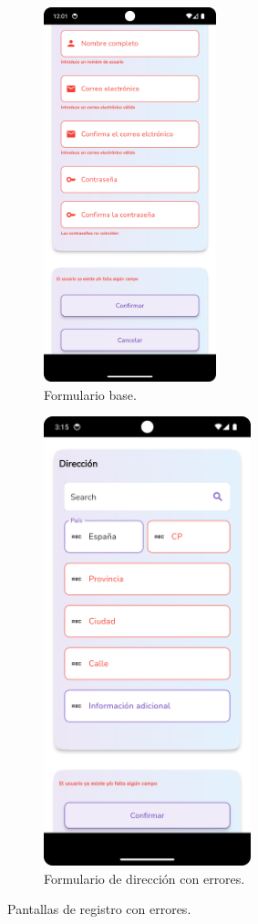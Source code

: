 \documentclass[a4paper, 12pt]{article}
\begin{document}
\begin{figure}[H]
   	\begin{subfigure}{0.48\textwidth}
		\begin{center}
			{\includegraphics[width=5cm]{app/RegisterUserError.png}\par}
			\caption{Formulario base.}
		\end{center}  
	\end{subfigure}\hfill
   	\begin{subfigure}{0.48\textwidth}
		\begin{center}
			{\includegraphics[width=6cm]{app/AddressError.png}\par}
			\caption{Formulario de dirección con errores.}
		\end{center}  
	\end{subfigure}\hfill
	\caption{Pantallas de registro con errores.}
\end{figure}
\end{document}
